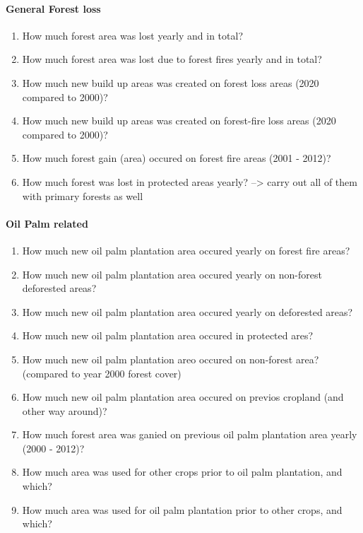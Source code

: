\documentclass[
]{article}
\let\oldparagraph\paragraph
\renewcommand{\paragraph}[1]{\oldparagraph{#1}\mbox{}}
\providecommand{\tightlist}{%
  \setlength{\itemsep}{0pt}\setlength{\parskip}{0pt}}\usepackage{longtable,booktabs,array}
\begin{document}
\hypertarget{general-forest-loss}{%
\paragraph{General Forest loss}\label{general-forest-loss}}

\begin{enumerate}
\def\labelenumi{\arabic{enumi}.}
\tightlist
\item
  How much forest area was lost yearly and in total?
\item
  How much forest area was lost due to forest fires yearly and in total?
\item
  How much new build up areas was created on forest loss areas (2020
  compared to 2000)?
\item
  How much new build up areas was created on forest-fire loss areas
  (2020 compared to 2000)?
\item
  How much forest gain (area) occured on forest fire areas (2001 -
  2012)?
\item
  How much forest was lost in protected areas yearly? --\textgreater{}
  carry out all of them with primary forests as well
\end{enumerate}

\hypertarget{oil-palm-related}{%
\paragraph{Oil Palm related}\label{oil-palm-related}}

\begin{enumerate}
\def\labelenumi{\arabic{enumi}.}
\tightlist
\item
  How much new oil palm plantation area occured yearly on forest fire
  areas?
\item
  How much new oil palm plantation area occured yearly on non-forest
  deforested areas?
\item
  How much new oil palm plantation area occured yearly on deforested
  areas?
\item
  How much new oil palm plantation area occured in protected ares?
\item
  How much new oil palm plantation areo occured on non-forest area?
  (compared to year 2000 forest cover)
\item
  How much new oil palm plantation area occured on previos cropland (and
  other way around)?
\item
  How much forest area was ganied on previous oil palm plantation area
  yearly (2000 - 2012)?
\item
  How much area was used for other crops prior to oil palm plantation,
  and which?
\item
  How much area was used for oil palm plantation prior to other crops,
  and which?
\end{enumerate}
\end{document}
